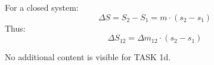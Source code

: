 For a closed system:  
\[
\Delta S = S_2 - S_1 = m \cdot (s_2 - s_1)
\]  
Thus:  
\[
\Delta S_{12} = \Delta m_{12} \cdot (s_2 - s_1)
\]  

No additional content is visible for TASK 1d.